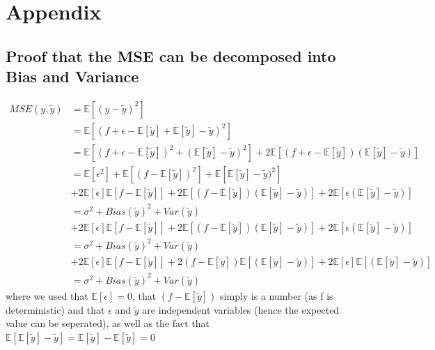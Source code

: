 \documentclass[11pt,a4paper,titlepage]{article}
\begin{document}
\section{Appendix}
\subsection{Proof that the MSE can be decomposed into Bias and Variance}
\begin{equation}\label{Proof}
\begin{split}
MSE(y,\tilde y) & =\mathbb{E}\left[({y}-{\tilde y})^2  \right] \\
&= \mathbb{E}\left[({f}+{\epsilon}-\mathbb{E}\left[\tilde y\right]+\mathbb{E}\left[\tilde y\right]-{\tilde y})^2  \right]\\
&= \mathbb{E}\left[(f+\epsilon- \mathbb{E}\left[\tilde y\right])^2+(\mathbb{E}\left[\tilde y\right]-{\tilde y})^2 \right]+2\mathbb{E}\left[(f+\epsilon-\mathbb{E}\left[\tilde y\right])(\mathbb{E}\left[\tilde y\right]-\tilde y)\right]\\
&= \mathbb{E}\left[\epsilon^2\right]+\mathbb{E}\left[(f-\mathbb{E}\left[\tilde y\right])^2\right]+\mathbb{E}\left[ \mathbb{E}\left[\tilde y\right]-\tilde y)^2\right]\\   & +2\mathbb{E}\left[\epsilon\right]\mathbb{E}\left[f-\mathbb{E}\left[\tilde y\right]\right]+2\mathbb{E}\left[(f-\mathbb{E}\left[\tilde y\right])(\mathbb{E}\left[\tilde y\right]-\tilde y)\right] +2\mathbb{E}\left[\epsilon (\mathbb{E}\left[\tilde y\right]-\tilde y)\right] \\ 
&=\sigma^2+Bias(\tilde y)^2+Var(\tilde y) \\ &
+2\mathbb{E}\left[\epsilon\right]\mathbb{E}\left[f-\mathbb{E}\left[\tilde y\right]\right]+2\mathbb{E}\left[(f-\mathbb{E}\left[\tilde y\right])(\mathbb{E}\left[\tilde y\right]-\tilde y)\right] +2\mathbb{E}\left[\epsilon (\mathbb{E}\left[\tilde y\right]-\tilde y)\right] \\
&=\sigma^2+Bias(\tilde y)^2+Var(\tilde y) \\ &
+2\mathbb{E}\left[\epsilon\right]\mathbb{E}\left[f-\mathbb{E}\left[\tilde y\right]\right]+2(f-\mathbb{E}\left[\tilde y\right])\mathbb{E}\left[(\mathbb{E}\left[\tilde y\right]-\tilde y)\right] +2\mathbb{E}\left[\epsilon\right]\mathbb{E}\left[ (\mathbb{E}\left[\tilde y\right]-\tilde y)\right]\\
&=\sigma^2+Bias(\tilde y)^2+Var(\tilde y)
\end{split}
\end{equation}
where we used that $\mathbb{E}\left[\epsilon\right]=0$, that $(f-\mathbb{E}\left[\tilde y\right])$ simply is a number (as f is deterministic) and that $\epsilon$ and $\tilde y$ are independent variables (hence the expected value can be seperated), as well as the fact that $\mathbb{E}\left[\mathbb{E}\left[\tilde y\right]-\tilde y\right]=\mathbb{E}\left[\tilde y\right]-\mathbb{E}\left[\tilde y\right]=0$ 


\end{document}
